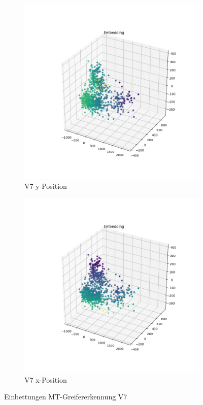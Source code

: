 	\begin{figure}[h]
	\centering

\begin{subfigure}[c]{0.49\textwidth}			
	\includegraphics[width=1\textwidth,center]{bilder/Hauptteil/MT_Grapple/EMB_alle/7_Embedding_y.png}
	\caption{V7 y-Position}
	\label{img:Einbettung7_y}	
\end{subfigure}
\centering
\begin{subfigure}[c]{0.49\textwidth}			
	\includegraphics[width=1\textwidth,center]{bilder/Hauptteil/MT_Grapple/EMB_alle/7_Embedding_x.png}
	\caption{V7 x-Position}
	\label{img:Einbettung7_x}		
\end{subfigure}

		\caption{Einbettungen MT-Greifererkennung V7}
		\label{img:EinbettungenV7}
	\end{figure}